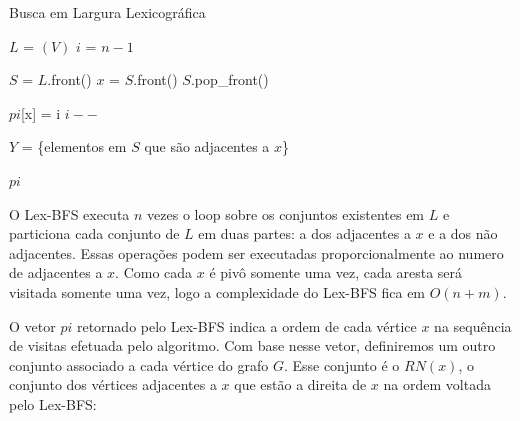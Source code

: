 \documentclass{article}
\begin{document}
\begin{algorithm}
    \caption{Busca em Largura Lexicográfica}
    \label{alg:lexbfs}
    
    \begin{algorithmic}

        \STATE $L$ = $(V)$ \;
        \STATE $i$ = $n - 1$\;
        
            \STATE $S$ = $L$.front() \;
            \STATE $x$ = $S$.front()  \;
            \STATE $S$.pop\_front()  \;
                  
            \ENDIF
                  
            \STATE $pi$[x] = i \;
            \STATE $i--$ \;
             
                \STATE $Y$ = \{elementos em $S$ que são adjacentes a $x$\}\;
                \ENDIF
             \ENDFOR
         \ENDWHILE
        
         \RETURN $pi$

    \end{algorithmic}
\end{algorithm}




O Lex-BFS executa $n$ vezes o loop sobre os
conjuntos existentes em $L$ e particiona cada conjunto de $L$ em duas partes:
a dos adjacentes a $x$ e a dos não adjacentes. Essas operações podem ser
executadas proporcionalmente ao numero de adjacentes a $x$. Como cada $x$ é
pivô somente uma vez, cada aresta será visitada somente uma vez, logo a
complexidade do Lex-BFS fica em $O(n+m)$.


O vetor $pi$ retornado pelo Lex-BFS indica a ordem de cada vértice $x$ na
sequência de visitas efetuada pelo algoritmo. Com base nesse vetor, definiremos
um outro conjunto associado a cada vértice do grafo $G$. Esse conjunto é o
$RN(x)$, o conjunto dos vértices adjacentes a $x$ que estão a direita de $x$
na ordem voltada pelo Lex-BFS:
\end{document}

